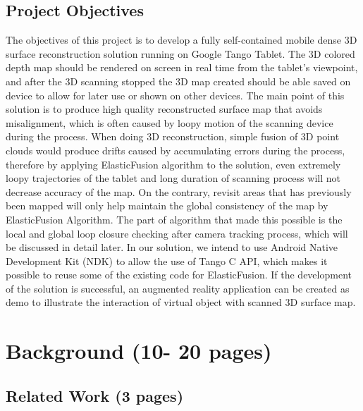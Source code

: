 \documentclass[12pt,twoside]{article}
\begin{document}
\subsection{Project Objectives}
The objectives of this project is to develop a fully self-contained mobile dense 3D surface reconstruction solution running on Google Tango Tablet. The 3D colored depth map should be rendered on screen in real time from the tablet's viewpoint, and after the 3D scanning stopped the 3D map created should be able saved on device to allow for later use or shown on other devices. The main point of this solution is to produce high quality reconstructed surface map that avoids misalignment, which is often caused by loopy motion of the scanning device during the process. When doing 3D reconstruction, simple fusion of 3D point clouds would produce drifts caused by accumulating errors during the process, therefore by applying ElasticFusion algorithm to the solution, even extremely loopy trajectories of the tablet and long duration of scanning process will not decrease accuracy of the map. On the contrary, revisit areas that has previously been mapped will only help maintain the global consistency of the map by ElasticFusion Algorithm. The part of algorithm that made this possible is the local and   global loop closure checking after camera tracking process, which will be discussed in detail later. In our solution, we intend to use Android Native Development Kit (NDK) to allow the use of Tango C API, which makes it possible to reuse some of the existing code for ElasticFusion. If the development of the solution is successful, an augmented reality application can be created as demo to illustrate the interaction of virtual object with scanned 3D surface map.

\section{Background (10- 20 pages)}

\subsection{Related Work (3 pages)}
\end{document}
